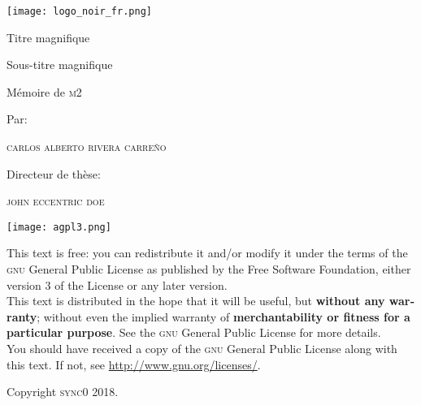 \documentclass[paper=A4,portrait,twoside=true,twocolumn=false,headinclude=false,footinclude=false,fontsize=11,BCOR=15mm,DIV=calc,pagesize=auto,titlepage=firstiscover,mpinclude=true,headings=normal,headings=twolinechapter,open=right,chapterprefix=false,headsepline=false,parskip=full]{scrbook}
\author{Carlos Alberto Rivera Carreño}
\date{}
\title{}
\begin{document}
\begin{titlepage}
 \centering
 \texttt{[image: logo\_noir\_fr.png]}\par
 \vspace{4\baselineskip}
 {\Huge Titre magnifique \par}
 \vspace{1\baselineskip}
 {\Large Sous-titre magnifique \par}
\vspace*{\fill}
 {\Large Mémoire de \textsc{m2} \par}
 \vspace{2\baselineskip}
 {\large Par: \par}
 {\large \textsc{carlos alberto rivera carreño}\par}
 \vspace{1\baselineskip}
 {\large Directeur de thèse: \par}
 {\large \textsc{john eccentric doe}\par}
\end{titlepage}

\vspace*{\fill}
\noindent
\texttt{[image: agpl3.png]}\par
\vspace{1\baselineskip}
\begin{english}
\noindent
This text is free: you can redistribute it and/or modify it
under the terms of the \textsc{gnu} General Public License as published by
the Free Software Foundation, either version 3 of the License or any later
version. \\

\noindent
This text is distributed in the hope that it will be useful, but \textbf{without
any warranty}; without even the implied warranty of \textbf{merchantability or 
fitness for a particular purpose}. See the \textsc{gnu} General 
Public License for more details. \\

\noindent
You should have received a copy of the \textsc{gnu} General Public License along
with this text. If not, see \url{http://www.gnu.org/licenses/}.

\vspace{1\baselineskip}
\noindent
Copyright \textcopyright \textsc{sync0} 2018. 
\end{english}

\thispagestyle{empty}

\newpage 
\vspace*{\fill}
\end{document}
